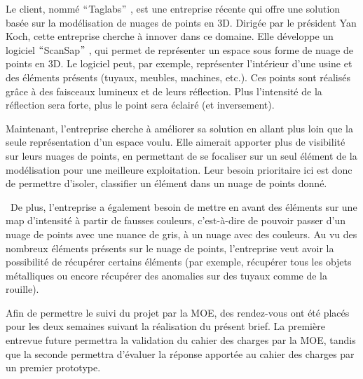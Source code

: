 \documentclass[12pt,titlepage]{report}
\begin{document}
\vspace{\baselineskip}
\begin{justify}
Le client, nommé $``$Taglabs$"$ , est une entreprise récente qui offre une solution basée sur la modélisation de nuages de points en 3D. Dirigée par le président Yan Koch, cette entreprise cherche à innover dans ce domaine. Elle développe un logiciel $``$ScanSap$"$ , qui permet de représenter un espace sous forme de nuage de points en 3D. Le logiciel peut, par exemple, représenter l’intérieur d’une usine et des éléments présents (tuyaux, meubles, machines, etc.). Ces points sont réalisés grâce à des faisceaux lumineux et de leurs réflection. Plus l’intensité de la réflection sera forte, plus le point sera éclairé (et inversement).
\end{justify}\par


\vspace{\baselineskip}
\begin{justify}
Maintenant, l’entreprise cherche à améliorer sa solution en allant plus loin que la seule représentation d’un espace voulu. Elle aimerait apporter plus de visibilité sur leurs nuages de points, en permettant de se focaliser sur un seul élément de la modélisation pour une meilleure exploitation. Leur besoin prioritaire ici est donc de permettre d’isoler, classifier un élément dans un nuage de points donné.
\end{justify}\par

\begin{justify}
\  De plus, l’entreprise a également besoin de mettre en avant des éléments sur une map d’intensité à partir de fausses couleurs, c’est-à-dire de pouvoir passer d’un nuage de points avec une nuance de gris, à un nuage avec des couleurs. Au vu des nombreux éléments présents sur le nuage de points, l’entreprise veut avoir la possibilité de récupérer certains éléments (par exemple, récupérer tous les objets métalliques ou encore récupérer des anomalies sur des tuyaux comme de la rouille).
\end{justify}\par

\begin{justify}
 \tab 
\end{justify}\par

\begin{justify}
Afin de permettre le suivi du projet par la MOE, des rendez-vous ont été placés pour les deux semaines suivant la réalisation du présent brief. La première entrevue future permettra la validation du cahier des charges par la MOE, tandis que la seconde permettra d’évaluer la réponse apportée au cahier des charges par un premier prototype. 
\end{justify}\par
\end{document}
